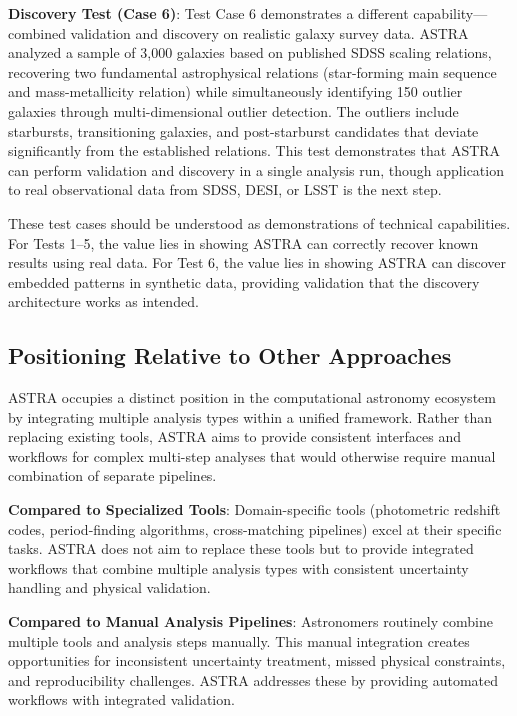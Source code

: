 \documentclass[usenatbib]{rasti}
\begin{document}
\textbf{Discovery Test (Case 6)}: Test Case 6 demonstrates a different capability---combined validation and discovery on realistic galaxy survey data. ASTRA analyzed a sample of 3,000 galaxies based on published SDSS scaling relations, recovering two fundamental astrophysical relations (star-forming main sequence and mass-metallicity relation) while simultaneously identifying 150 outlier galaxies through multi-dimensional outlier detection. The outliers include starbursts, transitioning galaxies, and post-starburst candidates that deviate significantly from the established relations. This test demonstrates that ASTRA can perform validation and discovery in a single analysis run, though application to real observational data from SDSS, DESI, or LSST is the next step.

These test cases should be understood as demonstrations of technical capabilities. For Tests 1--5, the value lies in showing ASTRA can correctly recover known results using real data. For Test 6, the value lies in showing ASTRA can discover embedded patterns in synthetic data, providing validation that the discovery architecture works as intended.

\subsection{Positioning Relative to Other Approaches}

ASTRA occupies a distinct position in the computational astronomy ecosystem by integrating multiple analysis types within a unified framework. Rather than replacing existing tools, ASTRA aims to provide consistent interfaces and workflows for complex multi-step analyses that would otherwise require manual combination of separate pipelines.

\textbf{Compared to Specialized Tools}: Domain-specific tools (photometric redshift codes, period-finding algorithms, cross-matching pipelines) excel at their specific tasks. ASTRA does not aim to replace these tools but to provide integrated workflows that combine multiple analysis types with consistent uncertainty handling and physical validation.

\textbf{Compared to Manual Analysis Pipelines}: Astronomers routinely combine multiple tools and analysis steps manually. This manual integration creates opportunities for inconsistent uncertainty treatment, missed physical constraints, and reproducibility challenges. ASTRA addresses these by providing automated workflows with integrated validation.
\end{document}
